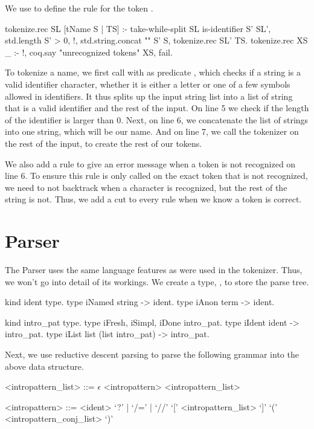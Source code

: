 \documentclass[thesis.tex]{subfiles}
\begin{document}
{{We use  to define the rule for the token .
\begin{elpicode}
  tokenize.rec SL [tName S | TS] :-
    take-while-split SL is-identifier S' SL',
    { std.length S' } > 0, !,
    std.string.concat "" S' S,
    tokenize.rec SL' TS.
  tokenize.rec XS _ :- !, 
    coq.say "unrecognized tokens" XS, fail.  
\end{elpicode}
To tokenize a name, we first call  with as predicate , which checks if a string is a valid identifier character, whether it is either a letter or one of a few symbols allowed in identifiers. It thus splits up the input string list into a list of string that is a valid identifier and the rest of the input. On line 5 we check if the length of the identifier is larger than 0. Next, on line 6, we concatenate the list of strings into one string, which will be our name. And on line 7, we call the tokenizer on the rest of the input, to create the rest of our tokens.

We also add a rule to give an error message when a token is not recognized on line 6. To ensure this rule is only called on the exact token that is not recognized, we need to not backtrack when a character is recognized, but the rest of the string is not. Thus, we add a cut to every rule when we know a token is correct.

\section{Parser}\label{ssec:parser}
The Parser uses the same language features as were used in the tokenizer. Thus, we won't go into detail of its workings. We create a type, , to store the parse tree.
\begin{elpicode}
  kind ident type.
  type iNamed string -> ident.
  type iAnon term -> ident.

  kind intro_pat type.
  type iFresh, iSimpl, iDone intro_pat.
  type iIdent ident -> intro_pat.
  type iList list (list intro_pat) -> intro_pat.
\end{elpicode}
Next, we use reductive descent parsing to parse the following grammar into the above data structure.
\begin{grammar}
  <intropattern\_list> ::= $\epsilon$
  \alt <intropattern> <intropattern\_list>

  <intropattern> ::= <ident>
  \alt `?' | `/=' | `//'
  \alt `[' <intropattern\_list> `]'
  \alt `(' <intropattern\_conj\_list> `)'


\end{grammar}}}
\end{document}
